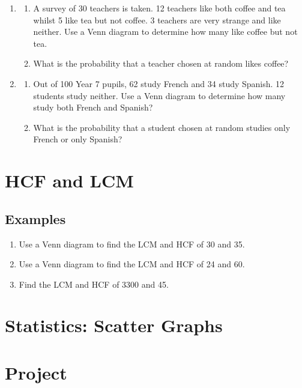 \documentclass{article}
\begin{document}
\begin{enumerate}
    \item \begin{enumerate}
        \item A survey of 30 teachers is taken. 12 teachers like both coffee and tea whilst 5 like tea but not coffee. 3 teachers are very strange and like neither. Use a Venn diagram to determine how many like coffee but not tea.
        \item What is the probability that a teacher chosen at random likes coffee?
    \end{enumerate}

    \item
    \begin{enumerate}
        \item Out of 100 Year 7 pupils, 62 study French and 34 study Spanish. 12 students study neither. Use a Venn diagram to determine how many study both French and Spanish?
        \item What is the probability that a student chosen at random studies only French or only Spanish?
    \end{enumerate}
\end{enumerate}

\newpage
\section{HCF and LCM}

\subsection*{Examples}

\begin{enumerate}
    \item Use a Venn diagram to find the LCM and HCF of 30 and 35.
    \item Use a Venn diagram to find the LCM and HCF of 24 and 60. 
    \item Find the LCM and HCF of 3300 and 45.
\end{enumerate}


\newpage
\section{Statistics: Scatter Graphs}

\newpage
\section{Project}
\end{document}

